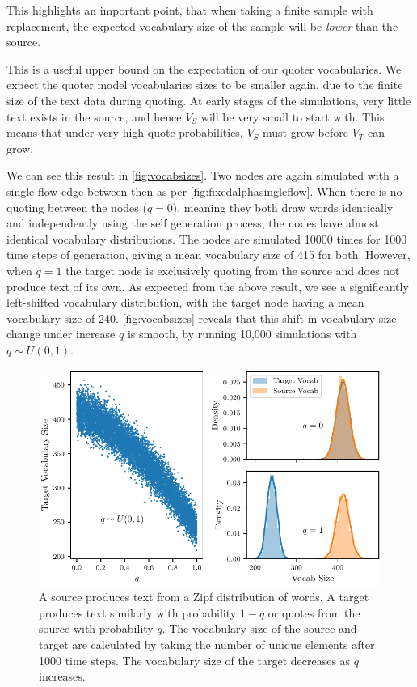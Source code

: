 This highlights an important point, that when taking a finite sample with replacement, the expected vocabulary size of the sample will be \emph{lower} than the source.

This is a useful upper bound on the expectation of our quoter vocabularies. We expect the quoter model vocabularies sizes to be smaller again, due to the finite size of the text data during quoting. At early stages of the simulations, very little text exists in the source, and hence $V_S$ will be very small to start with. This means that under very high quote probabilities, $V_S$ must grow before $V_T$ can grow. 

We can see this result in \autoref{fig:vocabsizes}. Two nodes are again simulated with a single flow edge between then as per \autoref{fig:fixedalphasingleflow}. When there is no quoting between the nodes ($q=0$), meaning they both draw words identically and independently using the self generation process, the nodes have almost identical vocabulary distributions. The nodes are simulated 10000 times for 1000 time steps of generation, giving a mean vocabulary size of 415 for both. However, when $q=1$ the target node is exclusively quoting from the source and does not produce text of its own. As expected from the above result, we see a significantly left-shifted vocabulary distribution, with the target node having a mean vocabulary size of 240. \autoref{fig:vocabsizes} reveals that this shift in vocabulary size change under increase $q$ is smooth, by running 10,000 simulations with $q \sim U(0,1)$.

\begin{figure}[!htbp]
\centering
\includegraphics{chapter3/figs/VocabChangePlot.pdf}
\caption{A source produces text from a Zipf distribution of words. A target produces text similarly with probability $1-q$ or quotes from the source with probability $q$. The vocabulary size of the source and target are calculated by taking the number of unique elements after 1000 time steps. The vocabulary size of the target decreases as $q$ increases.}\label{fig:vocabsizes}
\end{figure}

